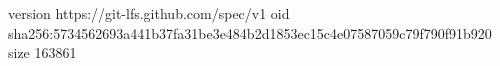 version https://git-lfs.github.com/spec/v1
oid sha256:5734562693a441b37fa31be3e484b2d1853ec15c4e07587059c79f790f91b920
size 163861

